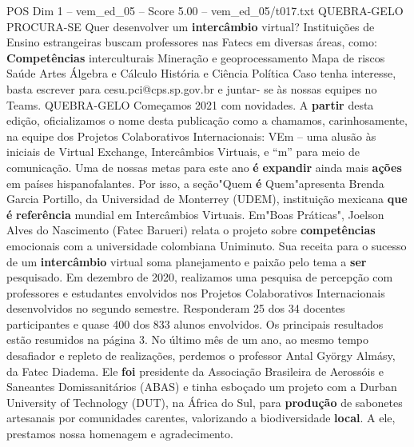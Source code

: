 \begin{textsample}{POS Dim 1 – vem\_ed\_05 – Score 5.00 – vem\_ed\_05/t017.txt}  \label{ex:f1_pos_105}
QUEBRA-GELO PROCURA-SE Quer desenvolver um \textbf{intercâmbio} virtual?
Instituições de Ensino estrangeiras buscam professores nas Fatecs em diversas áreas, como: \textbf{Competências} interculturais Mineração e geoprocessamento Mapa de riscos Saúde Artes Álgebra e Cálculo História e Ciência Política Caso tenha interesse, basta escrever para cesu.pci@cps.sp.gov.br e juntar- se às nossas equipes no Teams.
QUEBRA-GELO Começamos 2021 com novidades.
A \textbf{partir} desta edição, oficializamos o nome desta publicação como a chamamos, carinhosamente, na equipe dos Projetos Colaborativos Internacionais: VEm – uma alusão às iniciais de Virtual Exchange, Intercâmbios Virtuais, e “m” para meio de comunicação.
Uma de nossas metas para este ano \textbf{é} \textbf{expandir} ainda mais \textbf{ações} em países hispanofalantes.
Por isso, a seção"Quem \textbf{é} Quem"apresenta Brenda Garcia Portillo, da Universidad de Monterrey (UDEM), instituição mexicana \textbf{que} \textbf{é} \textbf{referência} mundial em Intercâmbios Virtuais.
Em"Boas Práticas", Joelson Alves do Nascimento (Fatec Barueri) relata o projeto sobre \textbf{competências} emocionais com a universidade colombiana Uniminuto.
Sua receita para o sucesso de um \textbf{intercâmbio} virtual soma planejamento e paixão pelo tema a \textbf{ser} pesquisado.
Em dezembro de 2020, realizamos uma pesquisa de percepção com professores e estudantes envolvidos nos Projetos Colaborativos Internacionais desenvolvidos no segundo semestre.
Responderam 25 dos 34 docentes participantes e quase 400 dos 833 alunos envolvidos.
Os principais resultados estão resumidos na página 3.
No último mês de um ano, ao mesmo tempo desafiador e repleto de realizações, perdemos o professor Antal György Almásy, da Fatec Diadema.
Ele \textbf{foi} presidente da Associação Brasileira de Aerossóis e Saneantes Domissanitários (ABAS) e tinha esboçado um projeto com a Durban University of Technology (DUT), na África do Sul, para \textbf{produção} de sabonetes artesanais por comunidades carentes, valorizando a biodiversidade \textbf{local}.
A ele, prestamos nossa homenagem e agradecimento.

\end{textsample}
